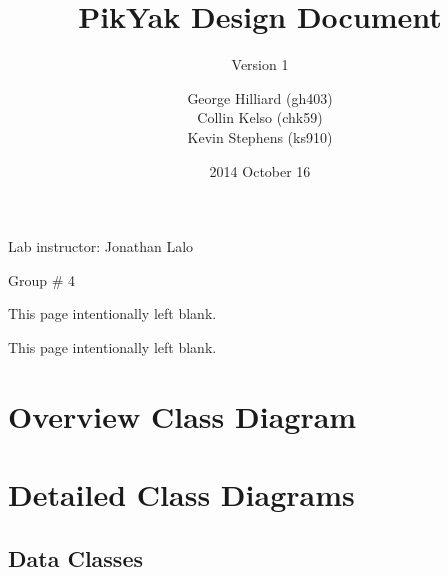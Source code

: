 \documentclass[11pt]{scrartcl}
\title{PikYak Design Document}
\subtitle{Version 1}
\author{
    George Hilliard (gh403) \\
    Collin Kelso (chk59) \\
    Kevin Stephens (ks910)
}
\date{2014 October 16}
\newcommand*{\blankpage}{%
\clearpage
\vspace*{\fill}
\centerline{This page intentionally left blank.}
\vspace{\fill}
\clearpage}
\let\stdsection\section
\renewcommand\section{\newpage\stdsection}
\begin{document}

\maketitle

\begin{center}
Lab instructor: Jonathan Lalo

Group \# 4
\end{center}

\blankpage

\tableofcontents

\blankpage


\section{Overview Class Diagram}

\section{Detailed Class Diagrams}
    \subsection{Data Classes}
\end{document}
